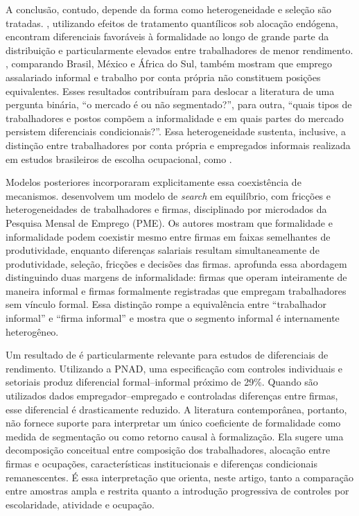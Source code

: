 \documentclass[12pt]{article}
\begin{document}
A conclusão, contudo, depende da forma como heterogeneidade e seleção são tratadas. 
\citet{dalberto2018}, utilizando efeitos de tratamento quantílicos sob alocação endógena, 
encontram diferenciais favoráveis à formalidade ao longo de grande parte da distribuição e 
particularmente elevados entre trabalhadores de menor rendimento. \citet{bargain2011}, 
comparando Brasil, México e África do Sul, também mostram que emprego assalariado informal 
e trabalho por conta própria não constituem posições equivalentes. Esses resultados 
contribuíram para deslocar a literatura de uma pergunta binária, “o mercado é ou não 
segmentado?”, para outra, “quais tipos de trabalhadores e postos compõem a informalidade 
e em quais partes do mercado persistem diferenciais condicionais?”. Essa heterogeneidade 
sustenta, inclusive, a distinção entre trabalhadores por conta própria e empregados 
informais realizada em estudos brasileiros de escolha ocupacional, como \citet{hirata2010b}.

Modelos posteriores incorporaram explicitamente essa coexistência de mecanismos. 
\citet{meghir2015} desenvolvem um modelo de \textit{search} em equilíbrio, com fricções 
e heterogeneidades de trabalhadores e firmas, disciplinado por microdados da Pesquisa Mensal 
de Emprego (PME). Os autores mostram que formalidade e informalidade 
podem coexistir mesmo entre firmas em faixas semelhantes de produtividade, enquanto diferenças 
salariais resultam simultaneamente de produtividade, seleção, fricções e decisões das 
firmas. \citet{ulyssea2018} aprofunda essa abordagem distinguindo duas margens de 
informalidade: firmas que operam inteiramente de maneira informal e firmas formalmente 
registradas que empregam trabalhadores sem vínculo formal. Essa distinção rompe a 
equivalência entre “trabalhador informal” e “firma informal” e mostra que o segmento 
informal é internamente heterogêneo.

Um resultado de \citet{ulyssea2018} é particularmente relevante para estudos de diferenciais 
de rendimento. Utilizando a PNAD, uma especificação com controles individuais e setoriais 
produz diferencial formal–informal próximo de 29\%. Quando são utilizados dados 
empregador–empregado e controladas diferenças entre firmas, esse diferencial é drasticamente 
reduzido. A literatura contemporânea, portanto, não fornece suporte para interpretar um 
único coeficiente de formalidade como medida de segmentação ou como retorno causal à 
formalização. Ela sugere uma decomposição conceitual entre composição dos trabalhadores, 
alocação entre firmas e ocupações, características institucionais e diferenças condicionais 
remanescentes. É essa interpretação que orienta, neste artigo, tanto a comparação entre 
amostras ampla e restrita quanto a introdução progressiva de controles por escolaridade, 
atividade e ocupação.
\end{document}
